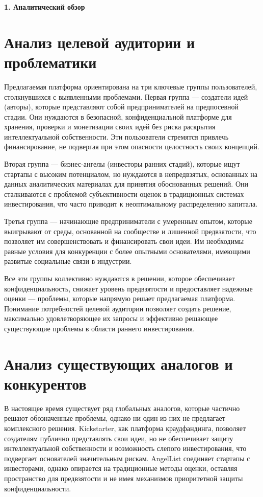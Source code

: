 \documentclass[
    candidate, %
    subf, %
]{disser}
\begin{document}
\newpage
\begin{center}
  \textbf{\large 1. Аналитический обзор }
\end{center}

\section{Анализ целевой аудитории и проблематики}

Предлагаемая платформа ориентирована на три ключевые группы пользователей, столкнувшихся с выявленными проблемами. Первая группа — создатели идей (авторы), которые представляют собой предпринимателей на предпосевной стадии. Они нуждаются в безопасной, конфиденциальной платформе для хранения, проверки и монетизации своих идей без риска раскрытия интеллектуальной собственности. Эти пользователи стремятся привлечь финансирование, не подвергая при этом опасности целостность своих концепций.

Вторая группа — бизнес-ангелы (инвесторы ранних стадий), которые ищут стартапы с высоким потенциалом, но нуждаются в непредвзятых, основанных на данных аналитических материалах для принятия обоснованных решений. Они сталкиваются с проблемой субъективности оценок в традиционных системах инвестирования, что часто приводит к неоптимальному распределению капитала.

Третья группа — начинающие предприниматели с умеренным опытом, которые выигрывают от среды, основанной на сообществе и лишенной предвзятости, что позволяет им совершенствовать и финансировать свои идеи. Им необходимы равные условия для конкуренции с более опытными основателями, имеющими развитые социальные связи в индустрии.

Все эти группы коллективно нуждаются в решении, которое обеспечивает конфиденциальность, снижает уровень предвзятости и предоставляет надежные оценки — проблемы, которые напрямую решает предлагаемая платформа. Понимание потребностей целевой аудитории позволяет создать решение, максимально удовлетворяющее их запросы и эффективно решающее существующие проблемы в области раннего инвестирования.

\section{Анализ существующих аналогов и конкурентов}

В настоящее время существует ряд глобальных аналогов, которые частично решают обозначенные проблемы, однако ни один из них не предлагает комплексного решения. Kickstarter, как платформа краудфандинга, позволяет создателям публично представлять свои идеи, но не обеспечивает защиту интеллектуальной собственности и возможность слепого инвестирования, что подвергает основателей значительным рискам. AngelList соединяет стартапы с инвесторами, однако опирается на традиционные методы оценки, оставляя пространство для предвзятости и не имея механизмов приоритетной защиты конфиденциальности.
\end{document}
